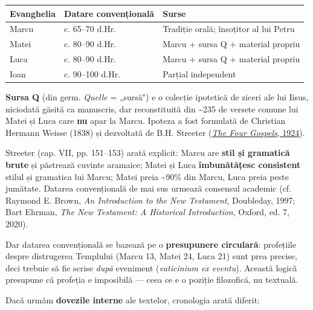 \documentclass[12pt,a4paper,twoside,openany]{book}
\begin{document}
\vspace{0.5em}
\noindent
\small
\begin{tabularx}{\textwidth}{L{2.2cm}L{4cm}X}
\toprule
{}
\textbf{Evanghelia} & \textbf{Datare convențională} & \textbf{Surse} \\
\midrule
Marcu & c. 65–70 d.Hr. & Tradiție orală; însoțitor al lui Petru \\
Matei & c. 80–90 d.Hr. & Marcu + sursa Q + material propriu \\
Luca & c. 80–90 d.Hr. & Marcu + sursa Q + material propriu \\
Ioan & c. 90–100 d.Hr. & Parțial independent \\
\bottomrule
\end{tabularx}
\normalsize
\par\noindent\textbf{Sursa Q} (din germ. \textit{Quelle} = „sursă") e o colecție ipotetică de ziceri ale lui Iisus, niciodată găsită ca manuscris, dar reconstituită din \textasciitilde{}235 de versete comune lui Matei și Luca care \textbf{nu} apar la Marcu. Ipoteza a fost formulată de Christian Hermann Weisse (1838) și dezvoltată de B.H. Streeter (\href{https://www.biblicalstudies.org.uk/pdf/4gospels_streeter/complete.pdf}{\textit{The Four Gospels}, 1924}).

Streeter (cap. VII, pp. 151–153) arată explicit: Marcu are \textbf{stil și gramatică brute} și păstrează cuvinte aramaice; Matei și Luca \textbf{îmbunătățesc consistent} stilul și gramatica lui Marcu; Matei preia \textasciitilde{}90\% din Marcu, Luca preia peste jumătate. Datarea convențională de mai sus urmează consensul academic (cf. Raymond E. Brown, \textit{An Introduction to the New Testament}, Doubleday, 1997; Bart Ehrman, \textit{The New Testament: A Historical Introduction}, Oxford, ed. 7, 2020).

Dar datarea convențională se bazează pe o \textbf{presupunere circulară}: profețiile despre distrugerea Templului (Marcu 13, Matei 24, Luca 21) sunt prea precise, deci trebuie să fie scrise \textit{după} eveniment (\textit{vaticinium ex eventu}). Această logică presupune că profeția e imposibilă — ceea ce e o poziție filozofică, nu textuală.

Dacă urmăm \textbf{dovezile interne} ale textelor, cronologia arată diferit:
\end{document}
